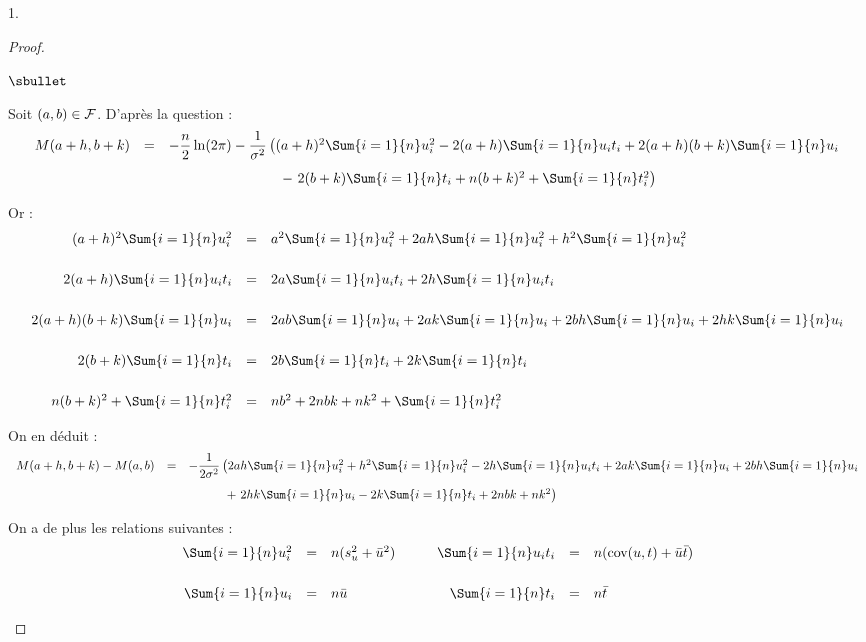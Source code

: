 \begin{noliste}{1.}
 \begin{proof}~
 \begin{noliste}{$\sbullet$}
  \item Soit $(a,b) \in {\cal F}$. D'après la question  :
  \[
   \begin{array}{rcl}
     M(a+h, b+k)
     & = & -\dfrac{n}{2} \ln(2\pi) - \dfrac{1}{\sigma^2}
    \left((a+h)^2 \Sum{i=1}{n} u_i^2 -2(a+h) \Sum{i=1}{n} u_i t_i
    +2(a+h)(b+k) \Sum{i=1}{n} u_i \right.
    \\[.4cm]
    & & \left. \qquad \qquad \qquad \qquad - \ 2(b+k) \Sum{i=1}{n} t_i
    +n(b+k)^2 + \Sum{i=1}{n} t_i^2 \right)
   \end{array}
  \]  
  
  Or :
  \[
   \begin{array}{rcl}
    (a+h)^2 \Sum{i=1}{n} u_i^2 &=& a^2 \Sum{i=1}{n} u_i^2 + 2ah 
    \Sum{i=1}{n} u_i^2 + h^2 \Sum{i=1}{n} u_i^2
    \\[.6cm]
    2(a+h) \Sum{i=1}{n} u_i t_i &=& 2a \Sum{i=1}{n} u_it_i
    + 2h \Sum{i=1}{n} u_i t_i
    \\[.6cm]
    2(a+h)(b+k) \Sum{i=1}{n} u_i &=& 2ab \Sum{i=1}{n} u_i + 2ak
    \Sum{i=1}{n} u_i + 2bh \Sum{i=1}{n} u_i + 2hk \Sum{i=1}{n} u_i
    \\[.6cm]
    2(b+k) \Sum{i=1}{n} t_i &=& 2b \Sum{i=1}{n} t_i + 2k \Sum{i=1}{n} 
    t_i
    \\[.6cm]
    n(b+k)^2 + \Sum{i=1}{n} t_i^2 &=& n b^2
    + 2nbk + nk^2 + \Sum{i=1}{n} t_i^2
   \end{array}
  \]
  
  On en déduit :
  \[
  \begin{array}{rcl}
   M(a+h,b+k) - M(a,b) &=& -\dfrac{1}{2\sigma^2} \left(
   2ah \Sum{i=1}{n} u_i^2 + h^2 \Sum{i=1}{n} u_i^2 -2h \Sum{i=1}{n}
   u_i t_i + 2ak \Sum{i=1}{n} u_i + 2bh \Sum{i=1}{n} u_i \right.
   \\[.4cm]
   & & \qquad \quad \left. + \ 2 hk \Sum{i=1}{n} u_i - 2k 
   \Sum{i=1}{n} t_i + 2nbk 
   +nk^2\right)
  \end{array}
  \]
  
  On a de plus les relations suivantes :
  \[
   \begin{array}{rclrcl}
    \Sum{i=1}{n} u_i^2 &=& n (s_u^2 + \bar{u}^2)
    & \qquad
    \Sum{i=1}{n} u_i t_i &=& n (\text{cov}(u,t) + \bar{u} \bar{t})
    \\[.6cm]
    \Sum{i=1}{n} u_i &=& n \bar{u}
    & \qquad
    \Sum{i=1}{n} t_i &=& n \bar{t}
   \end{array}
  \]
  

\end{noliste}
\end{proof}
\end{noliste}

